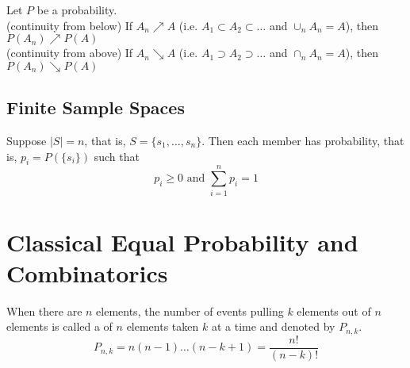 \documentclass[11pt]{article}
\begin{document}
 Let $P$ be a probability. \\
(continuity from below) If $A_n \nearrow A$ (i.e. $A_1 \subset A_2 \subset \hdots$ and $\cup_n A_n = A$), then $P(A_n) \nearrow P(A)$ \\
(continuity from above) If $A_n \searrow A$ (i.e. $A_1 \supset A_2 \supset \hdots$ and $\cap_n A_n = A$), then $P(A_n) \searrow P(A)$ \\

\subsection{Finite Sample Spaces}
Suppose $|S| = n$, that is, $S= \{s_1, \hdots, s_n\}$. Then each member has probability, that is, $p_i = P(\{s_i\})$ such that
$$p_i \geq 0 \text{ and } \sum_{i=1}^n p_i = 1$$ 

\section{Classical Equal Probability and Combinatorics}
When there are $n$ elements, the number of events pulling $k$ elements out of $n$ elements is called a  of $n$ elements taken $k$ at a time and denoted by $P_{n,k}$.
\theorem
$$P_{n,k} = n(n-1)\hdots(n-k+1) = \frac{n!}{(n-k)!}$$
\end{document}
